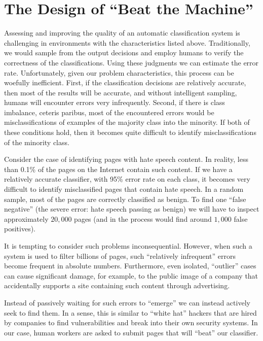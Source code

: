 \section{The Design of ``Beat the Machine''}

Assessing and improving the quality of an automatic classification system is
challenging in environments with the characteristics listed above. 
Traditionally, we would sample from the output decisions and employ humans to verify the correctness of the classifications.  Using these judgments we can estimate the error rate.  Unfortunately, given our problem characteristics, this process can be woefully inefficient. First, if the classification decisions are relatively accurate, then most of the results will be accurate, and without 
intelligent sampling, humans will encounter errors very infrequently.  Second, if there is class imbalance, ceteris paribus, most of the encountered errors would be misclassifications of examples of the majority class into the minority.  If both of these conditions hold, then it becomes quite difficult to identify misclassifications of the minority class.

\begin{xmpl} Consider the case of identifying pages with hate speech content. In   reality, less than 0.1\% of the pages on the Internet contain such content. If we   have a relatively accurate classifier, with 95\% error rate on each class, it becomes very difficult to identify misclassified pages that contain hate speech. In a random sample, most of the pages are correctly classified as benign. To find one ``false negative'' (the severe error: hate speech passing as benign) we will have to inspect approximately $20,000$ pages (and in the process would find around $1,000$ false positives). \end{xmpl}

It is tempting to consider such problems inconsequential. However, when such a system is used to filter billions of pages, such ``relatively infrequent'' errors become frequent in absolute numbers. Furthermore, even isolated, ``outlier'' cases can cause significant damage, for example, to the public image of a company that accidentally supports a site containing such content through advertising.

Instead of passively waiting for such errors to ``emerge'' we can instead actively seek to find them. In a sense, this is similar to ``white hat'' hackers that are hired by companies to find vulnerabilities and break into their own security systems. In our case, human workers are asked to submit pages that will ``beat'' our classifier.


